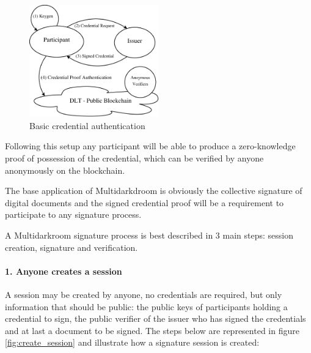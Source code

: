 \documentclass[twocolumn]{article}
\begin{document}


\begin{figure}
  \caption{Basic credential authentication }
  \label{fig:credential_diagram}
  \centering
  \includegraphics[width=0.5\textwidth]{credential_diagram.eps}
\end{figure}


Following this setup any participant will be able to produce a
zero-knowledge proof of possession of the credential, which can be
verified by anyone anonymously on the blockchain.

The base application of Multidarkdroom is obviously the collective
signature of digital documents and the signed credential proof will be a
requirement to participate to any signature process.

A Multidarkroom signature process is best described in 3 main steps:
session creation, signature and verification.

\paragraph*{1. Anyone creates a session}

A session may be created by anyone, no credentials are required, but only information that should be public: the public keys of participants holding a credential to sign, the public verifier of the issuer who has signed the credentials and at last a document to be signed. The steps below are represented in figure \ref{fig:create_session} and illustrate how a signature session is created: 
\end{document}
